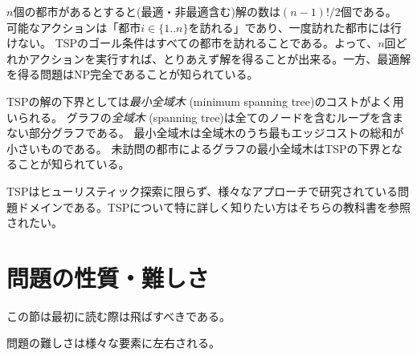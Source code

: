 \documentclass[10pt]{book}
\begin{document}
$n$個の都市があるとすると(最適・非最適含む)解の数は$(n-1)!/2$個である。
可能なアクションは「都市$i \in \{1..n\}$を訪れる」であり、一度訪れた都市には行けない。
TSPのゴール条件はすべての都市を訪れることである。よって、$n$回どれかアクションを実行すれば、とりあえず解を得ることが出来る。一方、最適解を得る問題はNP完全であることが知られている。

TSPの解の下界としては{\it 最小全域木} (minimum spanning tree)のコストがよく用いられる\cite{kruskal1956shortest,held1970traveling}。
グラフの{\it 全域木} (spanning tree)は全てのノードを含むループを含まない部分グラフである。
最小全域木は全域木のうち最もエッジコストの総和が小さいものである。
未訪問の都市によるグラフの最小全域木はTSPの下界となることが知られている。

TSPはヒューリスティック探索に限らず、様々なアプローチで研究されている問題ドメインである\cite{applegate2006traveling}。TSPについて特に詳しく知りたい方はそちらの教科書を参照されたい。

\section{問題の性質・難しさ}
\label{sec:difficulity}
この節は最初に読む際は飛ばすべきである。

問題の難しさは様々な要素に左右される。
\end{document}
